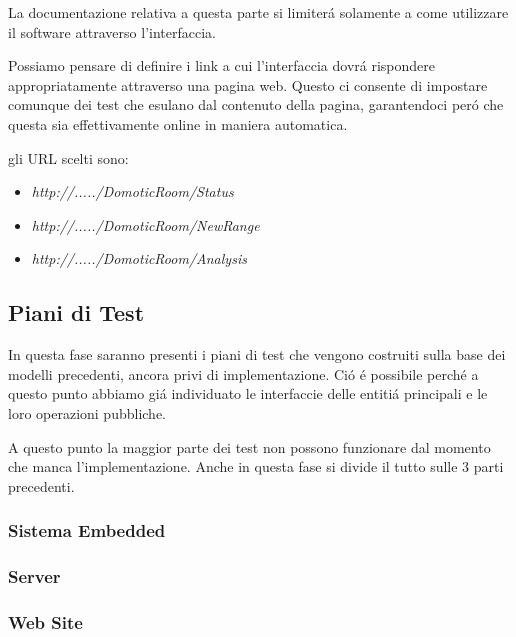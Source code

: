 La documentazione relativa a questa parte si limiter\'a solamente a come utilizzare il software attraverso l'interfaccia.

Possiamo pensare di definire i link a cui l'interfaccia dovr\'a rispondere appropriatamente attraverso una pagina web. Questo ci consente di impostare comunque dei test che esulano dal contenuto della pagina, garantendoci per\'o che questa sia effettivamente online in maniera automatica.

gli URL scelti sono:
\begin{itemize}
  \item \textit{http://...../DomoticRoom/Status}
  \item \textit{http://...../DomoticRoom/NewRange}
  \item \textit{http://...../DomoticRoom/Analysis}
\end{itemize}

\subsection{Piani di Test}

In questa fase saranno presenti i piani di test che vengono costruiti sulla base dei modelli precedenti, ancora privi di implementazione. Ci\'o \'e possibile perch\'e a questo punto abbiamo gi\'a individuato le interfaccie delle entiti\'a principali e le loro operazioni pubbliche.

A questo punto la maggior parte dei test non possono funzionare dal momento che manca l'implementazione. Anche in questa fase si divide il tutto sulle 3 parti precedenti.

\subsubsection{Sistema Embedded}
\subsubsection{Server}
\subsubsection{Web Site}

